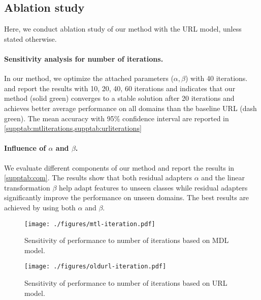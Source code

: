\subsection{Ablation study}
Here, we conduct ablation study of our method with the URL model, unless stated otherwise.
\paragraph{Sensitivity analysis for number of iterations.}
In our method, we optimize the attached parameters ($\alpha,\beta$) with 40 iterations.  and  report
the results with 10, 20, 40, 60 iterations and indicates that our method (solid green) converges to a stable solution after 20 iterations and achieves better average performance on all domains than the baseline URL (dash green). The mean accuracy with 95\% confidence interval are reported in \cref{supptab:mtliterations,supptab:urliterations}



\paragraph{Influence of $\alpha$ and $\beta$.} We evaluate different components of our method and report the results in \cref{supptab:com}. The results show that both residual adapters $\alpha$ and the linear transformation $\beta$ help adapt features to unseen classes while residual adapters significantly improve the performance on unseen domains. The best results are achieved by using both $\alpha$ and $\beta$.

\begin{figure}[h]
\begin{center}
\texttt{[image: ./figures/mtl-iteration.pdf]}
\end{center}
\vspace{-0.3in}
\caption{Sensitivity of performance to number of iterations based on MDL model.}
\label{suppfig:mdlstab}
\end{figure}

\begin{figure}[h]
\begin{center}

\texttt{[image: ./figures/oldurl-iteration.pdf]}
\end{center}
\vspace{-0.3in}
\caption{Sensitivity of performance to number of iterations based on URL model.}
\label{suppfig:urlstab}
\end{figure}


